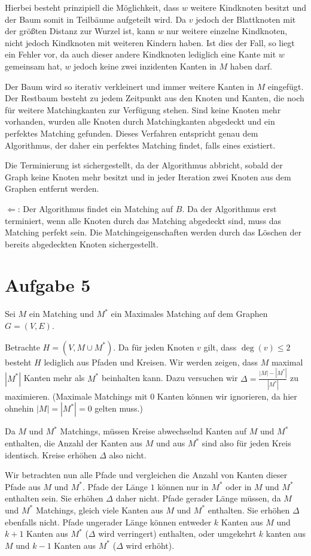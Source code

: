 \documentclass[a4paper]{article}
\begin{document}
Hierbei besteht prinzipiell die Möglichkeit, dass $w$ weitere Kindknoten
besitzt und der Baum somit in Teilbäume aufgeteilt wird. Da $v$ jedoch der
Blattknoten mit der größten Distanz zur Wurzel ist, kann $w$ nur weitere
einzelne Kindknoten, nicht jedoch Kindknoten mit weiteren Kindern haben.
Ist dies der Fall, so liegt ein Fehler vor, da auch dieser andere Kindknoten
lediglich eine Kante mit $w$ gemeinsam hat, $w$ jedoch keine zwei inzidenten
Kanten in $M$ haben darf.

Der Baum wird so iterativ verkleinert und immer weitere Kanten in $M$
eingefügt. Der Restbaum besteht zu jedem Zeitpunkt aus den Knoten und
Kanten, die noch für weitere Matchingkanten zur Verfügung stehen.
Sind keine Knoten mehr vorhanden, wurden alle Knoten durch Matchingkanten
abgedeckt und ein perfektes Matching gefunden.
Dieses Verfahren entspricht genau dem Algorithmus, der daher ein perfektes
Matching findet, falls eines existiert.

Die Terminierung ist sichergestellt, da der Algorithmus abbricht, sobald der
Graph keine Knoten mehr besitzt und in jeder Iteration zwei Knoten aus dem
Graphen entfernt werden.

$\Leftarrow$: Der Algorithmus findet ein Matching auf $B$. Da der
Algorithmus erst terminiert, wenn alle Knoten durch das Matching abgedeckt
sind, muss das Matching perfekt sein. Die Matchingeigenschaften werden durch
das Löschen der bereits abgedeckten Knoten sichergestellt.

\section{Aufgabe 5}
Sei $M$ ein Matching und $M^*$ ein Maximales Matching auf dem Graphen $G = (V,
E)$.

Betrachte $H = (V, M \cup M^*)$. Da für jeden Knoten $v$ gilt, dass $\deg(v)
\leq 2$ besteht $H$ lediglich aus Pfaden und Kreisen. Wir werden zeigen,
dass $M$ maximal $|M^*|$ Kanten mehr als $M^*$ beinhalten kann. Dazu
versuchen wir $\Delta = \frac{|M| - |M^*|}{|M^*|}$ zu maximieren. (Maximale
Matchings mit $0$ Kanten können wir ignorieren, da hier ohnehin $|M| = |M^*|
= 0$ gelten muss.)

Da $M$ und $M^*$ Matchings, müssen Kreise abwechselnd Kanten auf $M$ und
$M^*$ enthalten, die Anzahl der Kanten aus $M$ und aus $M^*$ sind also für
jeden Kreis identisch. Kreise erhöhen $\Delta$ also nicht.

Wir betrachten nun alle Pfade und vergleichen die Anzahl von Kanten dieser
Pfade aus $M$ und $M^*$. Pfade der Länge $1$ können nur in $M^*$ oder in 
$M$ und $M^*$ enthalten sein. Sie erhöhen $\Delta$ daher nicht.
Pfade gerader Länge müssen, da $M$ und $M^*$ Matchings, gleich viele Kanten
aus $M$ und $M^*$ enthalten. Sie erhöhen $\Delta$ ebenfalls nicht.
Pfade ungerader Länge können entweder $k$ Kanten aus $M$ und $k+1$ Kanten
aus $M^*$ ($\Delta$ wird verringert) enthalten, oder umgekehrt $k$ kanten
aus $M$ und $k-1$ Kanten aus $M^*$ ($\Delta$ wird erhöht).
\end{document}
